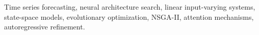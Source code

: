\documentclass[journal]{IEEEtran}
\begin{document}
\begin{IEEEkeywords}
Time series forecasting, neural architecture search, linear input-varying systems, state-space models, evolutionary optimization, NSGA-II, attention mechanisms, autoregressive refinement.
\end{IEEEkeywords}

\IEEEpeerreviewmaketitle




\end{document}
